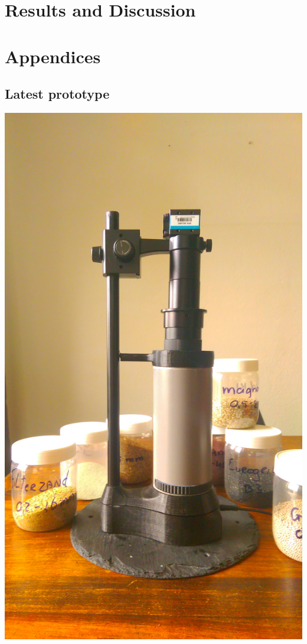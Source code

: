 \documentclass[fleqn,10pt]{SelfArx} %
\begin{document}
\section{Results and Discussion}

\lipsum[3] %

\printbibliography

\appendix
\newpage
\onecolumn
\section*{Appendices}
\renewcommand{\thesubsection}{\Alph{subsection}}
\subsection{Latest prototype}
\centering
\includegraphics[height=\textheight*\real{0.92}]{../images/FinalPrototype.jpg}\label{fig:VSA Prototype}
\end{document}
